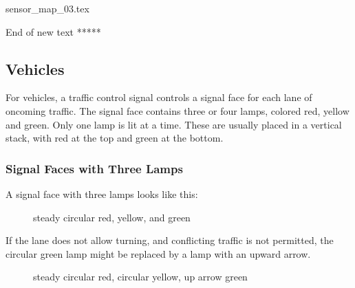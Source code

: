 \documentclass[letterpaper,twoside]{article}
\begin{document}
 {sensor_map_03.tex}




End of new text *****

\subsection{Vehicles}
For vehicles, a traffic control signal controls a signal face for each
lane of oncoming traffic.  The signal face contains three or four lamps,
colored red, yellow and green.  Only one lamp is lit at a time.
These are usually placed in a vertical stack, with red at the top and green
at the bottom.

\subsubsection{Signal Faces with Three Lamps}

A signal face with three lamps looks like this:

\begin{figure}[H]
           {\caption{steady circular red, yellow, and
               green}\label{fig:three_A}}
\end{figure}

If the lane does not allow turning, and conflicting traffic is not permitted,
the circular green lamp might be replaced by a lamp with an upward arrow.

\begin{figure}[H]
           {\caption{steady circular red, circular yellow, up arrow
               green}\label{fig:three_B}}
\end{figure}
\end{document}
